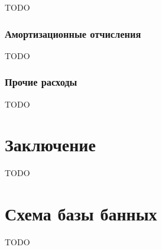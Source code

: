 \documentclass{mirea-prog-lang}
\begin{document}
TODO

\subsubsection{Амортизационные отчисления}

TODO

\subsubsection{Прочие расходы}

TODO

\section*{Заключение}
{}

TODO



\begin{thebibliography}{99\kern\bibindent}
\end{thebibliography}



\appendix

\section{Схема базы банных}

TODO

	
\end{document}
